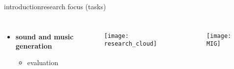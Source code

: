 \begin{frame}{introduction}{research focus (tasks)}
\begin{columns}
\begin{itemize}
         \item<3->  \textbf{sound and music generation}
            \begin{itemize}
                \item   evaluation \cite{yang_evaluation_2020, pati_is_2021, watcharasupat_latte_2022, vinay_evaluating_2022}
            \end{itemize}
    \end{itemize}
    \begin{figure}
        \texttt{[image: research\_cloud]}
    \end{figure}
		\vspace{-3mm}
    \begin{figure}
        \texttt{[image: MIG]}
    \end{figure}
    \end{columns}
\end{frame}
        

